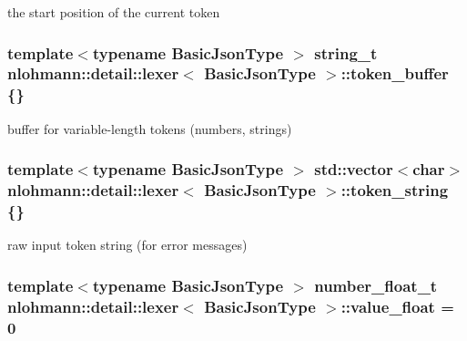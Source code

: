 the start position of the current token 

\subsubsection[{\texorpdfstring{token\+\_\+buffer}{token_buffer}}]{\setlength{\rightskip}{0pt plus 5cm}template$<$typename Basic\+Json\+Type $>$ {\bf string\+\_\+t} {\bf nlohmann\+::detail\+::lexer}$<$ Basic\+Json\+Type $>$\+::token\+\_\+buffer \{\}\hspace{0.3cm}{\ttfamily [private]}}\hypertarget{classnlohmann_1_1detail_1_1lexer_a8f43746570e5cadbc9b2b6b0c4c8e051}{}\label{classnlohmann_1_1detail_1_1lexer_a8f43746570e5cadbc9b2b6b0c4c8e051}


buffer for variable-\/length tokens (numbers, strings) 

\subsubsection[{\texorpdfstring{token\+\_\+string}{token_string}}]{\setlength{\rightskip}{0pt plus 5cm}template$<$typename Basic\+Json\+Type $>$ std\+::vector$<$char$>$ {\bf nlohmann\+::detail\+::lexer}$<$ Basic\+Json\+Type $>$\+::token\+\_\+string \{\}\hspace{0.3cm}{\ttfamily [private]}}\hypertarget{classnlohmann_1_1detail_1_1lexer_ad2960e3d54af8fb8d572a8f6f7731d62}{}\label{classnlohmann_1_1detail_1_1lexer_ad2960e3d54af8fb8d572a8f6f7731d62}


raw input token string (for error messages) 

\subsubsection[{\texorpdfstring{value\+\_\+float}{value_float}}]{\setlength{\rightskip}{0pt plus 5cm}template$<$typename Basic\+Json\+Type $>$ {\bf number\+\_\+float\+\_\+t} {\bf nlohmann\+::detail\+::lexer}$<$ Basic\+Json\+Type $>$\+::value\+\_\+float = 0\hspace{0.3cm}{\ttfamily [private]}}\hypertarget{classnlohmann_1_1detail_1_1lexer_a861ce804da2d257ee373d1e0b55780e1}{}\label{classnlohmann_1_1detail_1_1lexer_a861ce804da2d257ee373d1e0b55780e1}
